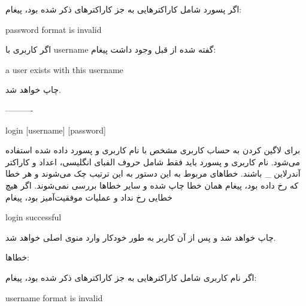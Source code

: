 \documentclass[]{article}
\begin{document}
اگر پسورد شامل کاراکترهایی به جز کاراکترهای ذکر شده بود، پیغام:



\begin{tcolorbox}[boxrule=0pt]
	\begin{latin}
  	  \large{
  	  	password format is invalid
		}
	\end{latin}
\end{tcolorbox}

اگر کاربری با username گفته شده از قبل وجود داشت پیغام:



\begin{tcolorbox}[boxrule=0pt]
	\begin{latin}
  	  \large{
  	  	a user exists with this username
		}
	\end{latin}
\end{tcolorbox}

چاپ خواهد شد.

----------



\begin{tcolorbox}[boxrule=0pt]
	\begin{latin}
  	  \large{
  	  	login [username] [password]
		}
	\end{latin}
\end{tcolorbox}

برای لاگین کردن به حساب کاربری مشخص با نام کاربری و پسورد داده شده استفاده می‌شود. نام کاربری و پسورد باید فقط شامل حروف الفبای انگلیسی، اعداد و کاراکتر آندرلاین \_ باشند. خطاهای مربوط به این دستور به این ترتیب چک می‌شوند و هر خطا که رخ داده بود، پیغام همان خطا چاپ شده و سایر خطاها بررسی نمی‌شوند. اگر هیچ خطایی رخ نداد و عملیات موفقیت‌آمیز بود، پیغام


\begin{tcolorbox}[boxrule=0pt]
	\begin{latin}
  	  \large{
  	  	login successful
		}
	\end{latin}
\end{tcolorbox}

چاپ خواهد شد و پس از آن کاربر به طور خودکار وارد منوی اصلی خواهد شد.

خطاها: 

اگر نام کاربری شامل کاراکترهایی به جز کاراکترهای ذکر شده بود، پیغام:



\begin{tcolorbox}[boxrule=0pt]
	\begin{latin}
  	  \large{
  	  	username format is invalid
		}
	\end{latin}
\end{tcolorbox}
\end{document}
